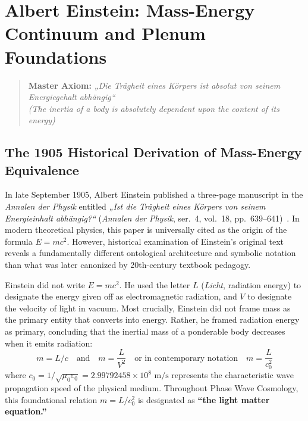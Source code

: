 \documentclass[11pt,a4paper]{article}
\begin{document}
\section{Albert Einstein: Mass-Energy Continuum and Plenum Foundations}
\label{sec:einstein_foundations}

\begin{quote}
\centering
\textbf{Master Axiom:} \textit{„Die Trägheit eines Körpers ist absolut von seinem Energiegehalt abhängig“}\\
\textit{(The inertia of a body is absolutely dependent upon the content of its energy)}
\end{quote}

\subsection{The 1905 Historical Derivation of Mass-Energy Equivalence}
\label{subsec:einstein_1905_derivation}

In late September 1905, Albert Einstein published a three-page manuscript in the \textit{Annalen der Physik} entitled \textit{„Ist die Trägheit eines Körpers von seinem Energieinhalt abhängig?“} (\textit{Annalen der Physik}, ser.~4, vol.~18, pp.~639--641)~\cite{Einstein1905b}. In modern theoretical physics, this paper is universally cited as the origin of the formula $E = mc^2$. However, historical examination of Einstein's original text reveals a fundamentally different ontological architecture and symbolic notation than what was later canonized by 20th-century textbook pedagogy.

Einstein did not write $E = mc^2$. He used the letter $L$ (\textit{Licht}, radiation energy) to designate the energy given off as electromagnetic radiation, and $V$ to designate the velocity of light in vacuum. Most crucially, Einstein did not frame mass as the primary entity that converts into energy. Rather, he framed radiation energy as primary, concluding that the inertial mass of a ponderable body decreases when it emits radiation:
\begin{equation}
m = L / c \quad \text{and} \quad m = \frac{L}{V^2} \quad \text{or in contemporary notation} \quad m = \frac{L}{c_0^2}
\label{eq:einstein_1905_original}
\end{equation}
where $c_0 = 1/\sqrt{\mu_0\varepsilon_0} = 2.99792458 \times 10^8\text{ m/s}$ represents the characteristic wave propagation speed of the physical medium. Throughout Phase Wave Cosmology, this foundational relation $m = L/c_0^2$ is designated as \textbf{``the light matter equation.''}
\end{document}
